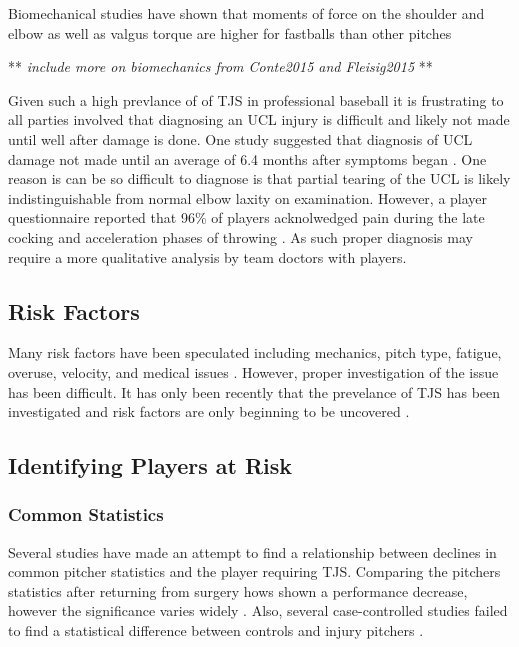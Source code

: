 Biomechanical studies have shown that moments of force on the shoulder and elbow as well as valgus torque are higher for fastballs than other pitches \cite{Keller2016}


** \emph{include more on biomechanics from Conte2015 and Fleisig2015} **


Given such a high prevlance of of TJS in professional baseball it is frustrating to all parties involved that diagnosing an UCL injury is difficult and likely not made until well after damage is done. One study suggested that diagnosis of UCL damage not made until an average of 6.4 months after symptoms began \cite{Cain2010}. One reason is can be so difficult to diagnose is that partial tearing of the UCL is likely indistinguishable from normal elbow laxity on examination. However, a player questionnaire reported that 96\% of players acknolwedged pain during the late cocking and acceleration phases of throwing \cite{Cain2010}. As such proper diagnosis may require a more qualitative analysis by team doctors with players.

\subsection{Risk Factors}

Many risk factors have been speculated including mechanics, pitch type, fatigue, overuse, velocity, and medical issues \cite{Keller2016}. However, proper investigation of the issue has been difficult. It has only been recently that the prevelance of TJS has been investigated and risk factors are only beginning to be uncovered \cite{Conte2015}.

\subsection{Identifying Players at Risk}

\subsubsection{Common Statistics}

Several studies have made an attempt to find a relationship between declines in common pitcher statistics and the player requiring TJS. Comparing the pitchers statistics after returning from surgery hows shown a performance decrease, however the significance varies widely \cite{Makhni2014}. Also, several case-controlled studies failed to find a statistical difference between controls and injury pitchers \cite{Jiang2014} \cite{Erickson2014}.

